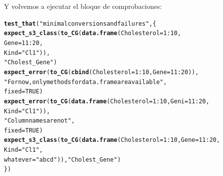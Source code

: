 \documentclass{config/apuntes}\usepackage[]{graphicx}\usepackage[]{xcolor}
\makeatletter
\newcommand{\hlnum}[1]{\textcolor[rgb]{0.686,0.059,0.569}{#1}}%
\newcommand{\hlsng}[1]{\textcolor[rgb]{0.192,0.494,0.8}{#1}}%
\newcommand{\hlopt}[1]{\textcolor[rgb]{0,0,0}{#1}}%
\newcommand{\hldef}[1]{\textcolor[rgb]{0.345,0.345,0.345}{#1}}%
\newcommand{\hlkwc}[1]{\textcolor[rgb]{0.333,0.667,0.333}{#1}}%
\newcommand{\hlkwd}[1]{\textcolor[rgb]{0.737,0.353,0.396}{\textbf{#1}}}%
\newenvironment{kframe}{%
 \def\at@end@of@kframe{}%
 \ifinner\ifhmode%
  \def\at@end@of@kframe{\end{minipage}}%
  \begin{minipage}{\columnwidth}%
 \fi\fi%
 \def\FrameCommand##1{\hskip\@totalleftmargin \hskip-\fboxsep
 \colorbox{shadecolor}{##1}\hskip-\fboxsep
     \hskip-\linewidth \hskip-\@totalleftmargin \hskip\columnwidth}%
 \MakeFramed {\advance\hsize-\width
   \@totalleftmargin\z@ \linewidth\hsize
   \@setminipage}}%
 {\par\unskip\endMakeFramed%
 \at@end@of@kframe}
\newenvironment{knitrout}{}{} %
\makeatother
\begin{document}
Y volvemos a ejecutar el bloque de comprobaciones:
\begin{knitrout}
\color{fgcolor}\begin{kframe}
\begin{alltt}
\hlkwd{test_that}\hldef{(}\hlsng{"minimal conversions and failures"}\hldef{, \{}
    \hlkwd{expect_s3_class}\hldef{(}\hlkwd{to_CG}\hldef{(}\hlkwd{data.frame}\hldef{(}\hlkwc{Cholesterol} \hldef{=} \hlnum{1}\hlopt{:}\hlnum{10}\hldef{,}
                                     \hlkwc{Gene} \hldef{=} \hlnum{11}\hlopt{:}\hlnum{20}\hldef{,}
                                     \hlkwc{Kind} \hldef{=} \hlsng{"Cl1"}\hldef{)),}
                    \hlsng{"Cholest_Gene"}\hldef{)}
    \hlkwd{expect_error}\hldef{(}\hlkwd{to_CG}\hldef{(}\hlkwd{cbind}\hldef{(}\hlkwc{Cholesterol} \hldef{=} \hlnum{1}\hlopt{:}\hlnum{10}\hldef{,} \hlkwc{Gene} \hldef{=} \hlnum{11}\hlopt{:}\hlnum{20}\hldef{)),}
                 \hlsng{"For now, only methods for data.frame are available"}\hldef{,}
                 \hlkwc{fixed} \hldef{=} \hlnum{TRUE}\hldef{)}
    \hlkwd{expect_error}\hldef{(}\hlkwd{to_CG}\hldef{(}\hlkwd{data.frame}\hldef{(}\hlkwc{Cholesterol} \hldef{=} \hlnum{1}\hlopt{:}\hlnum{10}\hldef{,} \hlkwc{Geni} \hldef{=} \hlnum{11}\hlopt{:}\hlnum{20}\hldef{,}
                                  \hlkwc{Kind} \hldef{=} \hlsng{"Cl1"}\hldef{)),}
                 \hlsng{"Column names are not"}\hldef{,}
                 \hlkwc{fixed} \hldef{=} \hlnum{TRUE}\hldef{)}
    \hlkwd{expect_s3_class}\hldef{(}\hlkwd{to_CG}\hldef{(}\hlkwd{data.frame}\hldef{(}\hlkwc{Cholesterol} \hldef{=} \hlnum{1}\hlopt{:}\hlnum{10}\hldef{,} \hlkwc{Gene} \hldef{=} \hlnum{11}\hlopt{:}\hlnum{20}\hldef{,}
                                     \hlkwc{Kind} \hldef{=} \hlsng{"Cl1"}\hldef{,}
                                     \hlkwc{whatever} \hldef{=} \hlsng{"abcd"}\hldef{)),} \hlsng{"Cholest_Gene"}\hldef{)}
\hldef{\})}
\end{alltt}
\end{kframe}
\end{knitrout}
\end{document}

